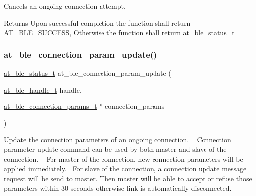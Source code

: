 Cancels an ongoing connection attempt. 

\begin{DoxyReturn}{Returns}
Upon successful completion the function shall return \mbox{\hyperlink{group__error__codes__group_gga3b1db9b95feb157b3c188ca27fe76988a7e3bfff5387331cd4f2c56cbcbbd7e19}{A\+T\+\_\+\+B\+L\+E\+\_\+\+S\+U\+C\+C\+E\+SS}}, Otherwise the function shall return \mbox{\hyperlink{at__ble__api_8h_ace24eb4e5ca3f325c663b809da5feb92}{at\+\_\+ble\+\_\+status\+\_\+t}} 
\end{DoxyReturn}
\mbox{\label{group__gap__conn__group_ga9e6ead4f518554d09fee5f458ff7b988}} 
\subsubsection{\texorpdfstring{at\_ble\_connection\_param\_update()}{at\_ble\_connection\_param\_update()}}
{\footnotesize\ttfamily \mbox{\hyperlink{group__error__codes__group_ga3b1db9b95feb157b3c188ca27fe76988}{at\+\_\+ble\+\_\+status\+\_\+t}} at\+\_\+ble\+\_\+connection\+\_\+param\+\_\+update (\begin{DoxyParamCaption}\item[{\mbox{\hyperlink{at__ble__api_8h_abd23646d0c662860741f787efc8456f2}{at\+\_\+ble\+\_\+handle\+\_\+t}}}]{handle,  }\item[{\mbox{\hyperlink{structat__ble__connection__params__t}{at\+\_\+ble\+\_\+connection\+\_\+params\+\_\+t}} $\ast$}]{connection\+\_\+params }\end{DoxyParamCaption})}



Update the connection parameters of an ongoing connection. ~\newline
 Connection parameter update command can be used by both master and slave of the connection. ~\newline
 For master of the connection, new connection parameters will be applied immediately.~\newline
 For slave of the connection, a connection update message request will be send to master. Then master will be able to accept or refuse those parameters within 30 seconds otherwise link is automatically disconnected. 


